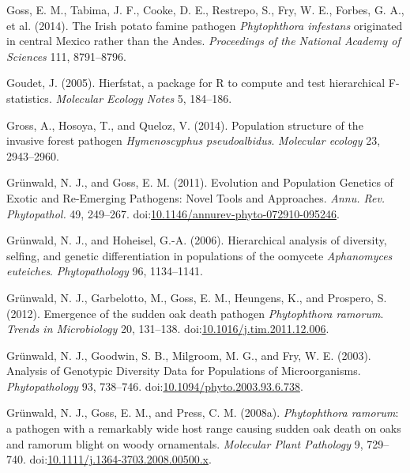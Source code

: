 \documentclass[double,12pt]{beavtex}
\begin{document}
  \hypertarget{ref-goss2014irish}{}
  Goss, E. M., Tabima, J. F., Cooke, D. E., Restrepo, S., Fry, W. E.,
  Forbes, G. A., et al. (2014). The Irish potato famine pathogen
  \emph{Phytophthora infestans} originated in central Mexico rather than
  the Andes. \emph{Proceedings of the National Academy of Sciences} 111,
  8791--8796.
  
  \hypertarget{ref-goudet2005hierfstat}{}
  Goudet, J. (2005). Hierfstat, a package for R to compute and test
  hierarchical F-statistics. \emph{Molecular Ecology Notes} 5, 184--186.
  
  \hypertarget{ref-gross2014population}{}
  Gross, A., Hosoya, T., and Queloz, V. (2014). Population structure of
  the invasive forest pathogen \emph{Hymenoscyphus pseudoalbidus}.
  \emph{Molecular ecology} 23, 2943--2960.
  
  \hypertarget{ref-grunwald2011evolution}{}
  Grünwald, N. J., and Goss, E. M. (2011). Evolution and Population
  Genetics of Exotic and Re-Emerging Pathogens: Novel Tools and
  Approaches. \emph{Annu. Rev. Phytopathol.} 49, 249--267.
  doi:\href{https://doi.org/10.1146/annurev-phyto-072910-095246}{10.1146/annurev-phyto-072910-095246}.
  
  \hypertarget{ref-grunwald2006hierarchical}{}
  Grünwald, N. J., and Hoheisel, G.-A. (2006). Hierarchical analysis of
  diversity, selfing, and genetic differentiation in populations of the
  oomycete \emph{Aphanomyces euteiches}. \emph{Phytopathology} 96,
  1134--1141.
  
  \hypertarget{ref-grunwald2012emergence}{}
  Grünwald, N. J., Garbelotto, M., Goss, E. M., Heungens, K., and
  Prospero, S. (2012). Emergence of the sudden oak death pathogen
  \emph{Phytophthora ramorum}. \emph{Trends in Microbiology} 20, 131--138.
  doi:\href{https://doi.org/10.1016/j.tim.2011.12.006}{10.1016/j.tim.2011.12.006}.
  
  \hypertarget{ref-grunwald2003analysis}{}
  Grünwald, N. J., Goodwin, S. B., Milgroom, M. G., and Fry, W. E. (2003).
  Analysis of Genotypic Diversity Data for Populations of Microorganisms.
  \emph{Phytopathology} 93, 738--746.
  doi:\href{https://doi.org/10.1094/phyto.2003.93.6.738}{10.1094/phyto.2003.93.6.738}.
  
  \hypertarget{ref-grunwald2008phytophthora}{}
  Grünwald, N. J., Goss, E. M., and Press, C. M. (2008a).
  \emph{Phytophthora ramorum}: a pathogen with a remarkably wide host
  range causing sudden oak death on oaks and ramorum blight on woody
  ornamentals. \emph{Molecular Plant Pathology} 9, 729--740.
  doi:\href{https://doi.org/10.1111/j.1364-3703.2008.00500.x}{10.1111/j.1364-3703.2008.00500.x}.
  
\end{document}
